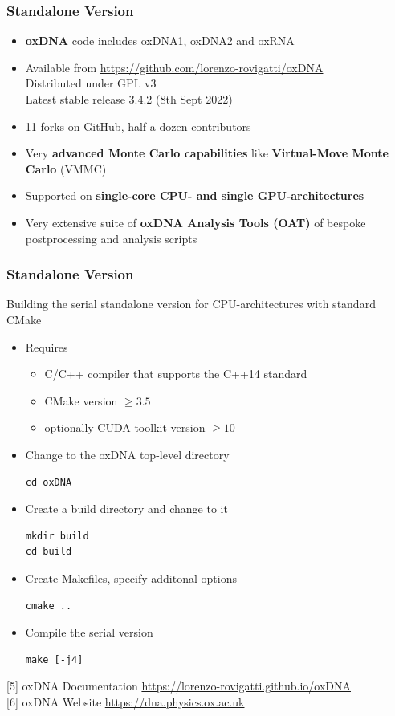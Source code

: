 \documentclass[slidestop,compress,9pt]{beamer}
\begin{document}
\begin{frame}
\frametitle{Standalone Version}

\begin{itemize}
\setlength\itemsep{10pt}
\item \textbf{oxDNA} code includes oxDNA1, oxDNA2 and oxRNA 
\item Available from \href{https://github.com/lorenzo-rovigatti/oxDNA}{https://github.com/lorenzo-rovigatti/oxDNA}\\
Distributed under GPL v3\\
Latest stable release 3.4.2 (8th Sept 2022)
\item 11 forks on GitHub, half a dozen contributors
\item Very \textbf{advanced Monte Carlo capabilities} like \textbf{Virtual-Move Monte Carlo} (VMMC) 
\item Supported on \textbf{single-core CPU- and single GPU-architectures}
\item Very extensive suite of \textbf{oxDNA Analysis Tools (OAT)} of bespoke postprocessing and analysis scripts 
\end{itemize}

\end{frame}

\begin{frame}[fragile]
\frametitle{Standalone Version}
Building the serial standalone version for CPU-architectures with standard CMake

\begin{itemize}
\item Requires

\begin{itemize}
\item C/C++ compiler that supports the C++14 standard
\item CMake version $\ge 3.5$
\item optionally CUDA toolkit version $\ge 10$
\end{itemize}
\item Change to the oxDNA top-level directory
\linespread{0.4}
\begin{lstlisting}
cd oxDNA
\end{lstlisting}
\item Create a build directory and change to it
\begin{lstlisting}
mkdir build
cd build
\end{lstlisting}
\item Create Makefiles, specify additonal options
\begin{lstlisting}
cmake ..
\end{lstlisting}
\item Compile the serial version
\begin{lstlisting}
make [-j4]
\end{lstlisting}
\end{itemize}

[5] oxDNA Documentation \href{https://lorenzo-rovigatti.github.io/oxDNA}{https://lorenzo-rovigatti.github.io/oxDNA}\\[3pt]
[6] oxDNA Website \href{https://dna.physics.ox.ac.uk}{https://dna.physics.ox.ac.uk}

\end{frame}
\end{document}
